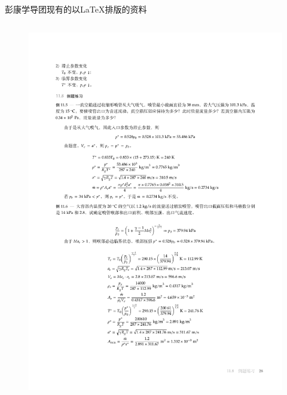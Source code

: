 \begin{frame}{彭康学导团现有的以\LaTeX 排版的资料}
\begin{itemize}
\begin{columns}
\begin{column}{0.48\textwidth}
\begin{figure}
                    \includegraphics[scale=0.2]{figures/PK_LL2.pdf}
                \end{figure}
            \end{column}
        \end{columns}
    \end{itemize}
\end{frame}

